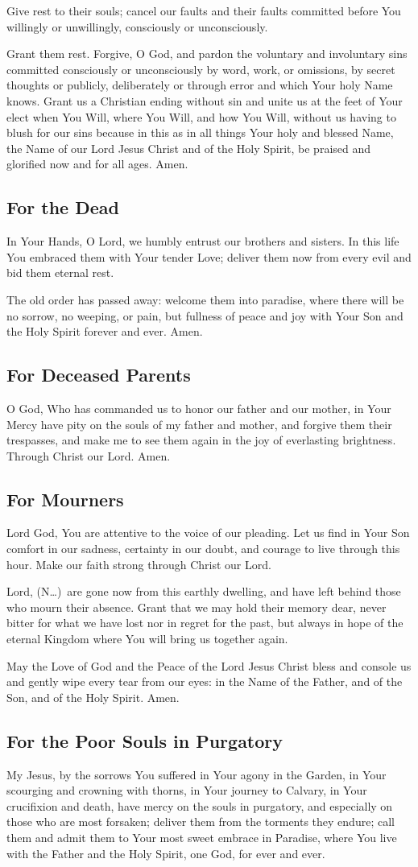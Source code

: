 \documentclass[12pt]{article}
\newcommand{\prayertitle}[1]{\subsection{#1}}
\newcommand{\insertname}{(N\dots)\xspace}
\begin{document}
Give rest to their souls;
cancel our faults and their faults committed before You willingly or unwillingly, consciously or unconsciously.

Grant them rest.
Forgive, O God, and pardon the voluntary and involuntary sins committed consciously or unconsciously by word, work, or omissions, by secret thoughts or publicly, deliberately or through error and which Your holy Name knows.
Grant us a Christian ending without sin and unite us at the feet of Your elect when You Will, where You Will, and how You Will, without us having to blush for our sins because in this as in all things Your holy and blessed Name, the Name of our Lord Jesus Christ and of the Holy Spirit, be praised and glorified now and for all ages. Amen.

\prayertitle{For the Dead}
\label{prayer:dead}
In Your Hands, O Lord, we humbly entrust our brothers and sisters.
In this life You embraced them with Your tender Love;
deliver them now from every evil and bid them eternal rest.

The old order has passed away:
welcome them into paradise, where there will be no sorrow, no weeping, or pain,
but fullness of peace and joy with Your Son and the Holy Spirit forever and ever.
Amen.

\prayertitle{For Deceased Parents}
O God, Who has commanded us to honor our father and our mother, in Your Mercy have pity on the souls of my father and mother, and forgive them their trespasses, and make me to see them again in the joy of everlasting brightness. Through Christ our Lord. Amen.

\prayertitle{For Mourners}
\label{prayer:mourners}
Lord God, You are attentive to the voice of our pleading.
Let us find in Your Son comfort in our sadness, certainty in our doubt, and courage to live through this hour.
Make our faith strong through Christ our Lord.

Lord, \insertname\ are gone now from this earthly dwelling, and have left behind those who mourn their absence.
Grant that we may hold their memory dear, never bitter for what we have lost
nor in regret for the past, but always in hope of the eternal Kingdom where You will bring us together again.

May the Love of God and the Peace of the Lord Jesus Christ bless and console us and gently wipe every tear from our eyes:
in the Name of the Father, and of the Son, and of the Holy Spirit.
Amen.

\prayertitle{For the Poor Souls in Purgatory}
\label{prayer:poor_souls_purgatory}
My Jesus, by the sorrows You suffered in Your agony in the Garden, in Your scourging and crowning with thorns, in Your journey to Calvary, in Your crucifixion and death, have mercy on the souls in purgatory, and especially on those who are most forsaken;
deliver them from the torments they endure;
call them and admit them to Your most sweet embrace in Paradise, where You live with the Father and the Holy Spirit, one God, for ever and ever.
\end{document}
